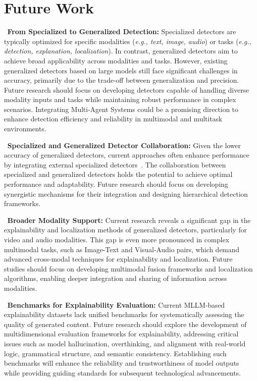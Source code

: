 \section{Future Work}
\label{sec:future}
~\textbf{From Specialized to Generalized Detection:} Specialized detectors are typically optimized for specific modalities (\textit{e.g., text, image, audio}) or tasks (\textit{e.g., detection, explanation, localization}). In contrast, generalized detectors aim to achieve broad applicability across modalities and tasks. However, existing generalized detectors based on large models still face significant challenges in accuracy, primarily due to the trade-off between generalization and precision. Future research should focus on developing detectors capable of handling diverse modality inputs and tasks while maintaining robust performance in complex scenarios. Integrating Multi-Agent Systems could be a promising direction to enhance detection efficiency and reliability in multimodal and multitask environments.


~\textbf{Specialized and Generalized Detector Collaboration:} Given the lower accuracy of generalized detectors, current approaches often enhance performance by integrating external specialized detectors~\cite{chen2024textit, huang2024ffaa}. The collaboration between specialized and generalized detectors holds the potential to achieve optimal performance and adaptability. Future research should focus on developing synergistic mechanisms for their integration and designing hierarchical detection frameworks. 


~\textbf{Broader Modality Support:} Current research reveals a significant gap in the explainability and localization methods of generalized detectors, particularly for video and audio modalities. This gap is even more pronounced in complex multimodal tasks, such as Image-Text and Visual-Audio pairs, which demand advanced cross-modal techniques for explainability and localization. Future studies should focus on developing multimodal fusion frameworks and localization algorithms, enabling deeper integration and sharing of information across modalities.

~\textbf{Benchmarks for Explainability Evaluation:} Current MLLM-based explainability datasets lack unified benchmarks for systematically assessing the quality of generated content. Future research should explore the development of multidimensional evaluation frameworks for explainability, addressing critical issues such as model hallucination, overthinking, and alignment with real-world logic, grammatical structure, and semantic consistency. Establishing such benchmarks will enhance the reliability and trustworthiness of model outputs while providing guiding standards for subsequent technological advancements.

